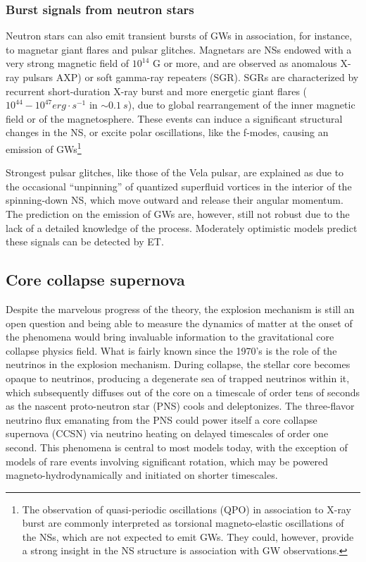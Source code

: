 \subsubsection{Burst signals from neutron stars}
Neutron stars can also emit transient bursts of GWs in association, for instance, to magnetar giant flares and pulsar glitches. Magnetars are NSs endowed with a very strong magnetic field of $10^{14}$ G or more, and are observed as anomalous X-ray pulsars AXP) or soft gamma-ray repeaters (SGR). SGRs are characterized by recurrent short-duration X-ray burst and more energetic giant flares ($10^{44}-10^{47} erg\cdot s^{-1}$ in $\sim 0.1~s$), due to global rearrangement of the inner magnetic field or of the magnetosphere. These events can induce a significant structural changes in the NS,  or excite polar oscillations, like the f-modes, causing an emission of GWs\footnote{The observation of quasi-periodic oscillations (QPO) in association to X-ray burst are commonly interpreted as torsional magneto-elastic oscillations of the NSs, which are not expected to emit GWs. They could, however, provide a strong insight in the NS structure is association with GW observations.}

Strongest pulsar glitches, like those of the Vela pulsar, are explained as due to the occasional ``unpinning'' of quantized superfluid vortices in the interior of the spinning-down NS, which move outward and release their angular momentum. The prediction on the emission of GWs are, however, still not robust due to the lack of a detailed knowledge of the process. Moderately optimistic models predict these signals can be detected by ET. 

\subsection{Core collapse supernova}
Despite the marvelous progress of the theory, the explosion mechanism is still an open question and being able to measure the dynamics of matter at the onset of the phenomena would bring invaluable information to the gravitational core collapse physics field. 
What is fairly known since the 1970's is the role of the neutrinos in the explosion mechanism. During collapse, the stellar core becomes opaque to neutrinos, producing a degenerate sea of trapped neutrinos within it, which subsequently diffuses out of the core on a timescale of order tens of seconds as the nascent proto-neutron star (PNS) cools and deleptonizes.
The three-flavor neutrino flux emanating from the PNS could power itself a core collapse supernova (CCSN) via neutrino heating on delayed timescales of order one second. This phenomena is central to most models today, with the exception of models of rare events involving significant rotation, which may be powered magneto-hydrodynamically and initiated on shorter timescales. 

